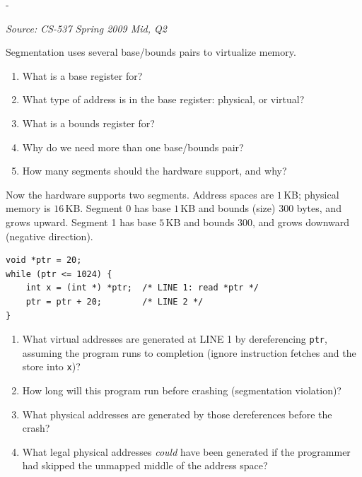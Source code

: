 \documentclass[11pt,a4paper]{article}
\makeatletter
\newcommand{\keepspace}[1]{\par\penalty-100\begingroup
  \setlength{\dimen@}{#1}\dimen@ii\pagegoal\advance\dimen@ii-\pagetotal
  \ifdim\dimen@>\dimen@ii\ifdim\dimen@ii>\z@\vfil\fi\break\fi\endgroup}
\newcounter{qn}[section]
\newenvironment{Qn}[4]{%
  \refstepcounter{qn}\keepspace{7\baselineskip}%
  \begin{tcolorbox}[qboxstyle, title={Q\thesection.\theqn\ \ [#1 \textbar\ #2]\ \ #4}]%
  {\footnotesize\color{g3}\textit{Source: #3}}\par\smallskip%
}{%
  \end{tcolorbox}%
}
\makeatother
\begin{document}
\begin{Qn}{Hard}{Lect 10}{CS-537 Spring 2009 Mid, Q2}{Two-segment hardware: registers, then a looping pointer that crashes}
Segmentation uses several base/bounds pairs to virtualize memory.
\begin{enumerate}
  \item[(a)] What is a base register for?
  \item[(b)] What type of address is in the base register: physical, or
        virtual?
  \item[(c)] What is a bounds register for?
  \item[(d)] Why do we need more than one base/bounds pair?
  \item[(e)] How many segments should the hardware support, and why?
\end{enumerate}

Now the hardware supports two segments. Address spaces are $1$\,KB;
physical memory is $16$\,KB. Segment 0 has base $1$\,KB and bounds
(size) $300$ bytes, and grows upward. Segment 1 has base $5$\,KB and
bounds $300$, and grows downward (negative direction).

\begin{lstlisting}[numbers=none]
void *ptr = 20;
while (ptr <= 1024) {
    int x = (int *) *ptr;  /* LINE 1: read *ptr */
    ptr = ptr + 20;        /* LINE 2 */
}
\end{lstlisting}
\begin{enumerate}
  \item[(f)] What virtual addresses are generated at LINE 1 by
        dereferencing \texttt{ptr}, assuming the program runs to
        completion (ignore instruction fetches and the store into
        \texttt{x})?
  \item[(g)] How long will this program run before crashing (segmentation
        violation)?
  \item[(h)] What physical addresses are generated by those
        dereferences before the crash?
  \item[(i)] What legal physical addresses \emph{could} have been
        generated if the programmer had skipped the unmapped middle of
        the address space?
\end{enumerate}
\end{Qn}
\end{document}
